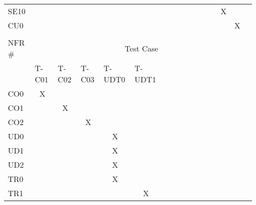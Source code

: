 \documentclass[12pt, titlepage]{article}
\begin{document}
\begin{longtable}{lcccclllllclcccc}
\multicolumn{1}{l|}{SE10} & \multicolumn{1}{l}{} & \multicolumn{1}{l}{} & \multicolumn{1}{l}{} & \multicolumn{1}{l}{} &  &  &  &  &  &  & \multicolumn{1}{c}{} &  & X &  &  \\
\multicolumn{1}{l|}{CU0} & \multicolumn{1}{l}{} & \multicolumn{1}{l}{} & \multicolumn{1}{l}{} & \multicolumn{1}{l}{} &  &  &  &  &  & \multicolumn{1}{l}{} &  & \multicolumn{1}{l}{} & \multicolumn{1}{l}{} & X & \multicolumn{1}{l}{} \\
 & \multicolumn{1}{l}{} & \multicolumn{1}{l}{} & \multicolumn{1}{l}{} & \multicolumn{1}{l}{} &  &  &  &  &  & \multicolumn{1}{l}{} &  & \multicolumn{1}{l}{} & \multicolumn{1}{l}{} & \multicolumn{1}{l}{} & \multicolumn{1}{l}{} \\
\multicolumn{1}{l|}{NFR \#} & \multicolumn{15}{c}{Test Case} \\ \hline
\multicolumn{1}{l|}{} & \multicolumn{1}{l}{T-C01} & \multicolumn{1}{l}{T-C02} & \multicolumn{1}{l}{T-C03} & \multicolumn{1}{l}{T-UDT0} & T-UDT1 &  &  &  &  & \multicolumn{1}{l}{} &  & \multicolumn{1}{l}{} & \multicolumn{1}{l}{} & \multicolumn{1}{l}{} & \multicolumn{1}{l}{} \\
\multicolumn{1}{l|}{CO0} & X & \multicolumn{1}{l}{} & \multicolumn{1}{l}{} & \multicolumn{1}{l}{} &  &  &  &  &  & \multicolumn{1}{l}{} &  & \multicolumn{1}{l}{} & \multicolumn{1}{l}{} & \multicolumn{1}{l}{} & \multicolumn{1}{l}{} \\
\multicolumn{1}{l|}{CO1} &  & X &  &  &  &  &  &  &  & \multicolumn{1}{l}{} &  & \multicolumn{1}{l}{} & \multicolumn{1}{l}{} & \multicolumn{1}{l}{} & \multicolumn{1}{l}{} \\
\multicolumn{1}{l|}{CO2} &  &  & X &  &  &  &  &  &  & \multicolumn{1}{l}{} &  & \multicolumn{1}{l}{} & \multicolumn{1}{l}{} & \multicolumn{1}{l}{} & \multicolumn{1}{l}{} \\
\multicolumn{1}{l|}{UD0} &  &  &  & X &  &  &  &  &  & \multicolumn{1}{l}{} &  & \multicolumn{1}{l}{} & \multicolumn{1}{l}{} & \multicolumn{1}{l}{} & \multicolumn{1}{l}{} \\
\multicolumn{1}{l|}{UD1} &  &  &  & X &  &  &  &  &  & \multicolumn{1}{l}{} &  & \multicolumn{1}{l}{} & \multicolumn{1}{l}{} & \multicolumn{1}{l}{} & \multicolumn{1}{l}{} \\
\multicolumn{1}{l|}{UD2} &  &  &  & X &  &  &  &  &  & \multicolumn{1}{l}{} &  & \multicolumn{1}{l}{} & \multicolumn{1}{l}{} & \multicolumn{1}{l}{} & \multicolumn{1}{l}{} \\
\multicolumn{1}{l|}{TR0} &  &  &  & X &  &  &  &  &  & \multicolumn{1}{l}{} &  & \multicolumn{1}{l}{} & \multicolumn{1}{l}{} & \multicolumn{1}{l}{} & \multicolumn{1}{l}{} \\
\multicolumn{1}{l|}{TR1} &  &  &  &  & \multicolumn{1}{c}{X} & \multicolumn{1}{c}{} &  &  &  & \multicolumn{1}{l}{} &  & \multicolumn{1}{l}{} & \multicolumn{1}{l}{} & \multicolumn{1}{l}{} & \multicolumn{1}{l}{}
\end{longtable}
\normalsize
\end{document}
